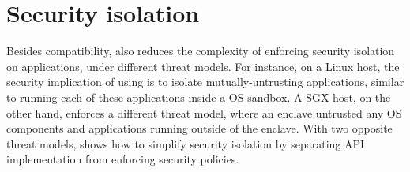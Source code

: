 \section{Security isolation}
\label{sec:intro:security}






Besides compatibility, \graphene{} also
reduces the complexity of enforcing security isolation on applications,
under different threat models.
For instance, on a Linux host, the security implication of using \graphene{} is to isolate mutually-untrusting applications,
similar to running each of these applications inside a OS sandbox.
A SGX host, on the other hand, enforces a different threat model,
where an enclave untrusted any OS components and applications running
outside of the enclave.
With two opposite threat models,
\graphene{} shows how to simplify security isolation
by separating API implementation from enforcing security policies.







